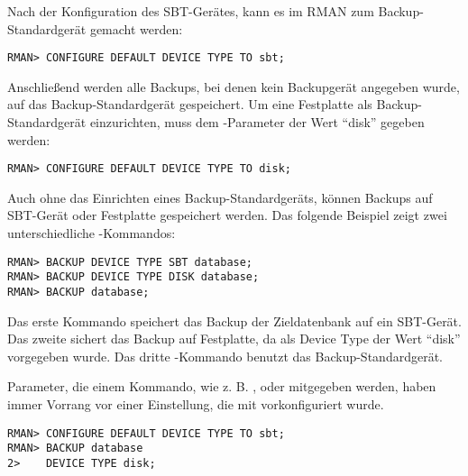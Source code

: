           Nach der Konfiguration des SBT-Ger\"ates, kann es im RMAN zum Backup-Standardger\"at gemacht werden:
          \begin{lstlisting}[caption={Konfigurieren des Backup-Standardger\"ats},label=admin1008,language=rman]
RMAN> CONFIGURE DEFAULT DEVICE TYPE TO sbt;
          \end{lstlisting}
          Anschlie\ss{}end werden alle Backups, bei denen kein Backupger\"at angegeben wurde, auf das Backup-Standardger\"at gespeichert. Um eine Festplatte als Backup-Standardger\"at einzurichten, muss dem -Parameter der Wert \enquote{disk} gegeben werden:
          \begin{lstlisting}[caption={Konfigurieren des Backup-Standardger\"ats auf Festplatte},label=admin1009,language=rman]
RMAN> CONFIGURE DEFAULT DEVICE TYPE TO disk;
          \end{lstlisting}
          Auch ohne das Einrichten eines Backup-Standardger\"ats, k\"onnen Backups auf SBT-Ger\"at oder Festplatte gespeichert werden. Das folgende Beispiel zeigt zwei unterschiedliche
          -Kommandos:
          \begin{lstlisting}[caption={Backup-Beispiele},label=admin1010,language=rman]
RMAN> BACKUP DEVICE TYPE SBT database;
RMAN> BACKUP DEVICE TYPE DISK database;
RMAN> BACKUP database;
          \end{lstlisting}
          Das erste Kommando  speichert das Backup der Zieldatenbank auf ein SBT-Ger\"at. Das zweite sichert das Backup auf Festplatte, da als Device Type der Wert \enquote{disk} vorgegeben wurde. Das dritte -Kommando benutzt das Backup-Standardger\"at.
          \begin{merke}
            Parameter, die einem Kommando, wie z. B. ,  oder  mitgegeben werden, haben immer Vorrang vor einer Einstellung, die mit  vorkonfiguriert wurde.
          \end{merke}
          \begin{lstlisting}[caption={\"Uberschreiben einer Konfigurationseinstellungen},label=admin1011,language=rman]
RMAN> CONFIGURE DEFAULT DEVICE TYPE TO sbt;
RMAN> BACKUP database
2>    DEVICE TYPE disk;
          \end{lstlisting}
